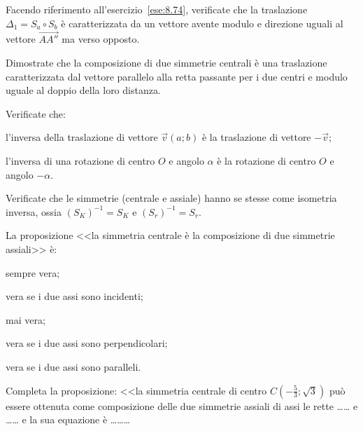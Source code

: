 \begin{esercizio}
\label{ese:8.75} %
Facendo riferimento all'esercizio~\ref{ese:8.74}, verificate che la 
traslazione \(\Delta_1 = S_a \circ S_b\) è caratterizzata da un vettore 
avente modulo e direzione uguali al vettore \(\overrightarrow{AA''}\) 
ma verso opposto.
\end{esercizio}


\begin{esercizio}
\label{ese:8.79} %
Dimostrate che la composizione di due simmetrie centrali è una 
traslazione caratterizzata dal vettore parallelo alla retta passante 
per i due centri e modulo uguale al doppio della loro distanza.
\end{esercizio}


\begin{esercizio}
\label{ese:8.82} %
Verificate che:
\begin{enumeratea}
\item l'inversa della traslazione di vettore \(\vec{v}(a;b)\) è la 
traslazione di vettore \(-\vec{v}\);
\item l'inversa di una rotazione di centro \(O\) e angolo \(\alpha\) è la 
rotazione di centro \(O\) e angolo \(-\alpha\).
\end{enumeratea}
\end{esercizio}

\begin{esercizio}
\label{ese:8.83} %
Verificate che le simmetrie (centrale e assiale) hanno se stesse come 
isometria inversa, ossia \((S_K)^{-1}=S_K\) e \((S_r)^{-1}=S_r\).
\end{esercizio}

\begin{esercizio}
\label{ese:8.84} %
La proposizione <<la simmetria centrale è la composizione di due 
simmetrie assiali>> è:
\begin{enumeratea}
\item sempre vera;
\item vera se i due assi sono incidenti;
\item mai vera;
\item vera se i due assi sono perpendicolari;
\item vera se i due assi sono paralleli.
\end{enumeratea}
\end{esercizio}

\begin{esercizio}
\label{ese:8.85} %
Completa la proposizione: <<la simmetria centrale di centro 
\(C\left(-\frac{5}{3};\sqrt{3}\right)\) può essere ottenuta come 
composizione delle due simmetrie assiali di assi le rette 
\ldots\ldots{} e \ldots\ldots{} e la sua equazione è 
\ldots\ldots\ldots{}
\end{esercizio}

